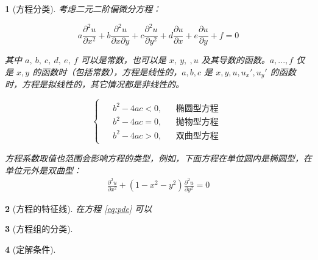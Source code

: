 \documentclass[zihao=5,UTF8]{report}
\theoremstyle{MyTheoremStyle} %
\theoremstyle{MySubsubsectionStyle} %
\newtheorem{definition}{}
\begin{document}
\begin{definition}[方程分类]
    考虑二元二阶偏微分方程：

    \begin{equation}\label{eq:pde}
        a\frac{\partial^2u}{\partial x^2}+b\frac{\partial^2u}{\partial x\partial y}+c\frac{\partial^2u}{\partial y^2}+d\frac{\partial u}{\partial x}+e\frac{\partial u}{\partial y}+f=0
    \end{equation}
    
    其中 $a,\ b,\ c,\ d,\ e,\ f$ 可以是常数，也可以是 $x,\ y,\ ,u$ 及其导数的函数。$a,...,f$ 仅是 $x,y$ 的函数时（包括常数），方程是线性的，$a,b,c$ 是 $x,y,u,u_x',u_y'$ 的函数时，方程是拟线性的，其它情况都是非线性的。
    
    \begin{equation*}
        \begin{cases}
            \begin{aligned}
                &b^2 - 4ac < 0, && \text{椭圆型方程}\\ 
                &b^2 - 4ac = 0, && \text{抛物型方程}\\ 
                &b^2 - 4ac > 0, && \text{双曲型方程}
            \end{aligned}
        \end{cases}
    \end{equation*}
    
    {\par\color{gray}\small
    方程系数取值也范围会影响方程的类型，例如，下面方程在单位圆内是椭圆型，在单位元外是双曲型：
    \begin{equation*}
        \begin{aligned}\frac{\partial^2u}{\partial x^2}+(1-x^2-y^2)\frac{\partial^2u}{\partial y^2}=0\end{aligned}
    \end{equation*}
    \par}
    
\end{definition}

\begin{definition}[方程的特征线]
    在方程 \ref*{eq:pde} 可以
\end{definition}

\begin{definition}[方程组的分类]

\end{definition}


\begin{definition}[定解条件]

\end{definition}
\end{document}
